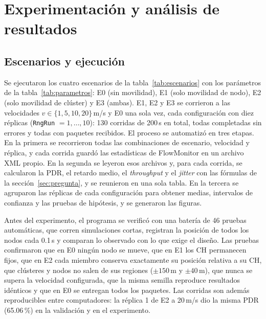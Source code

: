 \section{Experimentación y análisis de resultados}
\label{sec:experimentacion}

\subsection{Escenarios y ejecución}

Se ejecutaron los cuatro escenarios de la tabla~\ref{tab:escenarios} con los parámetros
de la tabla~\ref{tab:parametros}: E0 (sin movilidad), E1 (solo movilidad de nodo), E2
(solo movilidad de clúster) y E3 (ambas). E1, E2 y E3 se corrieron a las velocidades
$v \in \{1, 5, 10, 20\}$\,m/s y E0 una sola vez, cada configuración con diez réplicas
(\texttt{RngRun} $= 1, \dots, 10$): 130 corridas de 200\,s en total, todas completadas
sin errores y todas con paquetes recibidos. El proceso se automatizó en tres etapas. En
la primera se recorrieron todas las combinaciones de escenario, velocidad y réplica, y
cada corrida guardó las estadísticas de FlowMonitor en un archivo XML propio. En la
segunda se leyeron esos archivos y, para cada corrida, se calcularon la PDR, el retardo
medio, el \emph{throughput} y el \emph{jitter} con las fórmulas de la
sección~\ref{sec:pregunta}, y se reunieron en una sola tabla. En la tercera se agruparon
las réplicas de cada configuración para obtener medias, intervalos de confianza y las
pruebas de hipótesis, y se generaron las figuras.

Antes del experimento, el programa se verificó con una batería de 46 pruebas
automáticas, que corren simulaciones cortas, registran la posición de todos los nodos cada
0.1\,s y comparan lo observado con lo que exige el diseño. Las pruebas confirmaron que en E0
ningún nodo se mueve, que en E1 los CH permanecen fijos, que en E2 cada miembro conserva
exactamente su posición relativa a su CH, que clústeres y nodos no salen de sus regiones
($\pm 150$\,m y $\pm 40$\,m), que nunca se supera la velocidad configurada, que la misma
semilla reproduce resultados idénticos y que en E0 se entregan todos los paquetes. Las
corridas son además reproducibles entre computadores: la réplica 1 de E2 a 20\,m/s dio la
misma PDR (65.06\,\%) en la validación y en el experimento.

